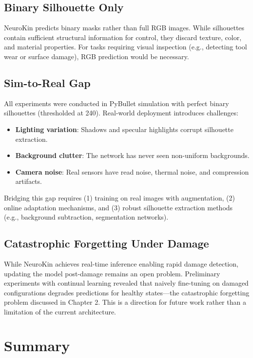 ﻿\documentclass[12pt,a4paper,oneside]{report}
\begin{document}
\subsection{Binary Silhouette Only}

NeuroKin predicts binary masks rather than full RGB images. While silhouettes contain sufficient structural information for control, they discard texture, color, and material properties. For tasks requiring visual inspection (e.g., detecting tool wear or surface damage), RGB prediction would be necessary.

\subsection{Sim-to-Real Gap}

All experiments were conducted in PyBullet simulation with perfect binary silhouettes (thresholded at 240). Real-world deployment introduces challenges:

\begin{itemize}
    \item \textbf{Lighting variation}: Shadows and specular highlights corrupt silhouette extraction.
    \item \textbf{Background clutter}: The network has never seen non-uniform backgrounds.
    \item \textbf{Camera noise}: Real sensors have read noise, thermal noise, and compression artifacts.
\end{itemize}

Bridging this gap requires (1) training on real images with augmentation, (2) online adaptation mechanisms, and (3) robust silhouette extraction methods (e.g., background subtraction, segmentation networks).

\subsection{Catastrophic Forgetting Under Damage}

While NeuroKin achieves real-time inference enabling rapid damage detection, updating the model post-damage remains an open problem. Preliminary experiments with continual learning revealed that naively fine-tuning on damaged configurations degrades predictions for healthy states---the catastrophic forgetting problem discussed in Chapter 2. This is a direction for future work rather than a limitation of the current architecture.

\section{Summary}
\end{document}

